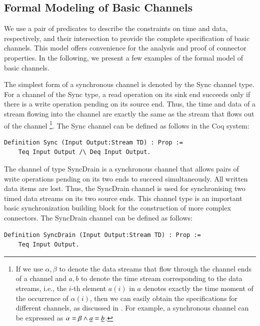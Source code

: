 \documentclass[preprint,3p]{elsarticle}
\begin{document}
\subsection{Formal Modeling of Basic Channels}

We use a pair of predicates to describe the constraints on time and data, respectively, and their intersection to provide the complete specification of basic channels. This model offers convenience for the analysis and proof of connector properties. In the following, we present a few examples of the formal model of basic channels.

The simplest form of a synchronous channel is denoted by the Sync channel type. For a channel of the Sync type, a read operation on
its sink end succeeds only if there is a write operation pending on its source end. Thus, the time and data of a stream flowing
into the channel are exactly the same as the stream that flows out of the channel
\footnote{If we use $\alpha,\beta$ to denote the data streams that flow through the channel ends of a channel and $a,b$ to denote the time stream corresponding to the data streams, i.e., the $i$-th element $a(i)$ in $a$ denotes exactly the time moment of the occurrence of $\alpha(i)$, then we can easily obtain the specifications for different channels, as discussed in \cite{Sun12,SAA+12}. For example, a synchronous channel can be expressed as $\alpha=\beta \wedge \emph{a}=\emph{b}$.}.
The Sync channel can be defined as follows in the Coq system:
\begin{lstlisting}[language=coq]
Definition Sync (Input Output:Stream TD) : Prop :=
    Teq Input Output /\ Deq Input Output.
\end{lstlisting}


The channel of type SyncDrain is a synchronous channel that allows pairs of write operations pending on its two ends to succeed simultaneously. All written data items are lost. Thus, the SyncDrain channel is used for synchronising two timed data streams on its two source ends. This channel type is an important basic synchronization building block for the construction of more complex connectors. The SyncDrain channel can be defined as follows:
\begin{lstlisting}[language=coq]
Definition SyncDrain (Input Output:Stream TD) : Prop :=
    Teq Input Output.
\end{lstlisting}
\end{document}
